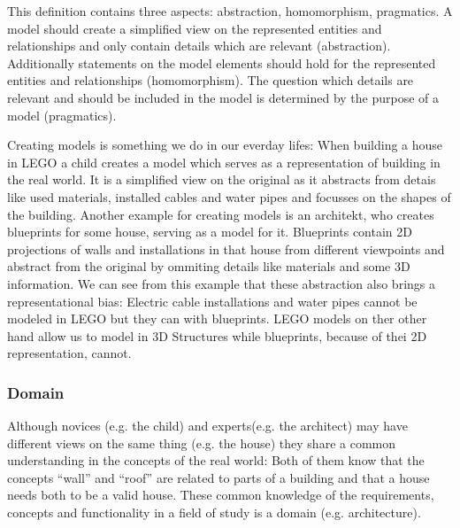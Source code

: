 \documentclass[runningheads,a4paper]{llncs}
\begin{document}
  This definition contains three aspects: abstraction, homomorphism, pragmatics.
  A model should create a simplified view on the represented entities and relationships and 
  only contain details which are relevant (abstraction).
  Additionally statements on the model elements should hold for the represented entities and relationships (homomorphism).
  The question which details are relevant and should be included in the model is determined by the purpose of a model (pragmatics).  
 
  Creating models is something we do in our everday lifes:
  When building a house in LEGO a child creates a model which serves as a representation of building in the real world.
  It is a simplified view on the original as it abstracts from detais like used materials, installed cables and water pipes and focusses
  on the shapes of the building.
  Another example for creating models is an architekt, who creates blueprints for some house, serving as a model for it.
  Blueprints contain 2D projections of walls and installations in that house from different viewpoints and abstract from the original by ommiting
  details like materials and some 3D information. 
  We can see from this example that these abstraction also brings a representational bias:
  Electric cable installations and water pipes cannot be modeled in LEGO but they can with blueprints.
  LEGO models on ther other hand allow us to model in 3D Structures while blueprints, because of thei 2D representation, cannot.
  
\subsubsection{Domain}
  
  Although novices (e.g. the child) and experts(e.g. the architect) may have different views on the same thing (e.g. the house)
  they share a common understanding in the concepts of the real world: 
  Both of them know that the concepts ``wall'' and ``roof'' are related to parts of a building and that a house needs both to be a valid house.
  These common knowledge of the requirements, concepts and functionality in a field of study is a domain (e.g. architecture). 
  
  
\end{document}
